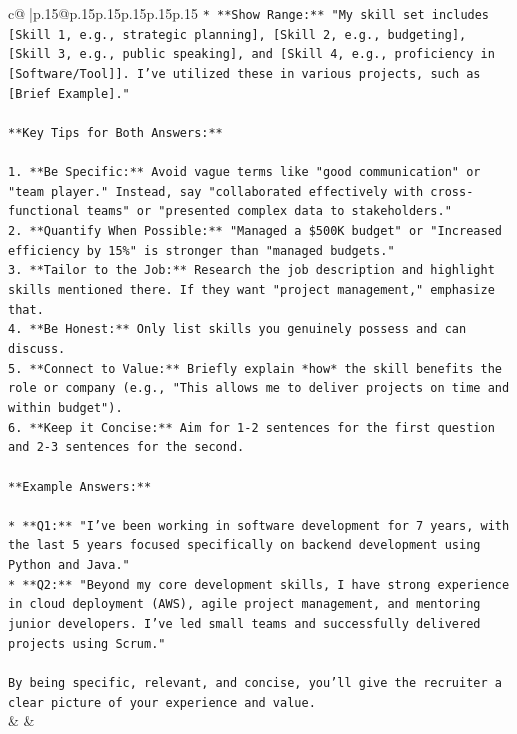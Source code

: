 \documentclass{article}
\begin{document}
{\begin{supertabular}{c@{$\;$}|p{.15\linewidth}@{}p{.15\linewidth}p{.15\linewidth}p{.15\linewidth}p{.15\linewidth}p{.15\linewidth}}
{{{\texttt{*   **Show Range:** "My skill set includes {[}Skill 1, e.g., strategic planning{]}, {[}Skill 2, e.g., budgeting{]}, {[}Skill 3, e.g., public speaking{]}, and {[}Skill 4, e.g., proficiency in {[}Software/Tool{]}{]}. I've utilized these in various projects, such as {[}Brief Example{]}."} \\
\\ 
\texttt{**Key Tips for Both Answers:**} \\
\\ 
\texttt{1.  **Be Specific:** Avoid vague terms like "good communication" or "team player." Instead, say "collaborated effectively with cross{-}functional teams" or "presented complex data to stakeholders."} \\
\texttt{2.  **Quantify When Possible:** "Managed a \$500K budget" or "Increased efficiency by 15\%" is stronger than "managed budgets."} \\
\texttt{3.  **Tailor to the Job:** Research the job description and highlight skills mentioned there. If they want "project management," emphasize that.} \\
\texttt{4.  **Be Honest:** Only list skills you genuinely possess and can discuss.} \\
\texttt{5.  **Connect to Value:** Briefly explain *how* the skill benefits the role or company (e.g., "This allows me to deliver projects on time and within budget").} \\
\texttt{6.  **Keep it Concise:** Aim for 1{-}2 sentences for the first question and 2{-}3 sentences for the second.} \\
\\ 
\texttt{**Example Answers:**} \\
\\ 
\texttt{*   **Q1:** "I've been working in software development for 7 years, with the last 5 years focused specifically on backend development using Python and Java."} \\
\texttt{*   **Q2:** "Beyond my core development skills, I have strong experience in cloud deployment (AWS), agile project management, and mentoring junior developers. I've led small teams and successfully delivered projects using Scrum."} \\
\\ 
\texttt{By being specific, relevant, and concise, you'll give the recruiter a clear picture of your experience and value.} \\
            }
        }
    }
    & & \\ \\


\end{supertabular}}
\end{document}
